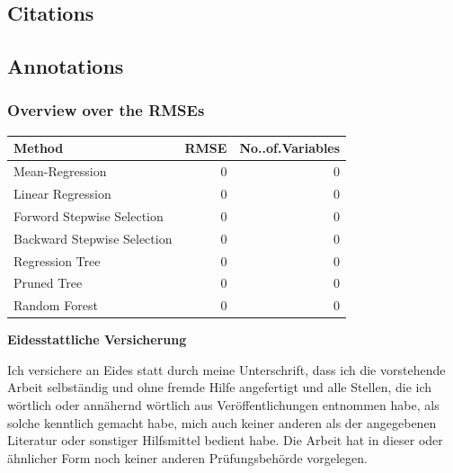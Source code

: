 \documentclass[11pt,]{article}
\begin{document}
\pagebreak

\hypertarget{citations}{%
\subsection{Citations}\label{citations}}

\pagebreak

\hypertarget{annotations}{%
\subsection{Annotations}\label{annotations}}

\hypertarget{overview-over-the-rmses}{%
\subsubsection{Overview over the RMSEs}\label{overview-over-the-rmses}}

\begin{tabular}{l|r|r}
\hline
Method & RMSE & No..of.Variables\\
\hline
Mean-Regression & 0 & 0\\
\hline
Linear Regression & 0 & 0\\
\hline
Forword Stepwise Selection & 0 & 0\\
\hline
Backward Stepwise Selection & 0 & 0\\
\hline
Regression Tree & 0 & 0\\
\hline
Pruned Tree & 0 & 0\\
\hline
Random Forest & 0 & 0\\
\hline
\end{tabular}
\renewcommand*{\mkbibnamefamily}[1]{\textbf{#1}}
\renewcommand*{\mkbibnamegiven}[1]{\textbf{#1}}
\renewcommand*{\mkbibnameprefix}[1]{\textbf{#1}}
\renewcommand*{\mkbibnamesuffix}[1]{\textbf{#1}}
\printbibliography[title=References]

\newpage
\textbf{Eidesstattliche Versicherung}

\bigskip

Ich versichere an Eides statt durch meine Unterschrift, dass ich die vorstehende Arbeit selbständig und ohne fremde Hilfe angefertigt und alle Stellen, die ich wörtlich oder annähernd wörtlich aus Veröffentlichungen entnommen habe, als solche kenntlich gemacht habe, mich auch keiner anderen als der angegebenen Literatur oder sonstiger Hilfsmittel bedient habe. Die Arbeit hat in dieser oder ähnlicher Form noch keiner anderen Prüfungsbehörde vorgelegen.

\vspace{1cm}
\rule{0pt}{2\baselineskip} %
\par\noindent{} \hfill\makebox[2.25in]{\hrulefill}%
\par\noindent\makebox[2.25in][l]{} \hfill{}%
\end{document}
